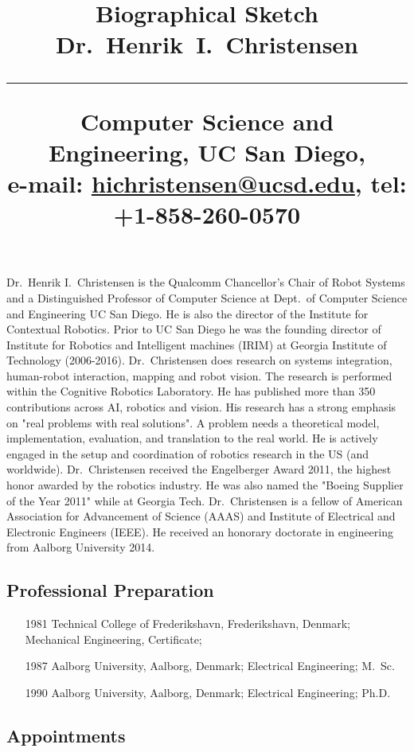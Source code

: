 \documentclass[svgnames,11pt]{article}
\title{%
        \vspace{-2\baselineskip}
            \normalsize
            Biographical Sketch\\
            {\large\textbf{Dr.~Henrik~I.~Christensen}}\\
            \vspace{0.5\baselineskip}
            \hrule
            \vspace{0.5\baselineskip}
            Computer Science and Engineering, UC San Diego,\\
            e-mail: \href{mailto:hichristensen@ucsd.edu}{hichristensen@ucsd.edu},
            tel: +1-858-260-0570
        \vspace{-1.5ex}
        }
\date{}
\author{}
\begin{document}
\maketitle
\vspace{-2\baselineskip}

Dr.~Henrik I.~Christensen is the Qualcomm
Chancellor's Chair of Robot Systems and a Distinguished Professor of
Computer Science at Dept.~of Computer Science and Engineering UC San
Diego. He is also the director of the Institute for Contextual
Robotics. Prior to UC San Diego he was the founding director of
Institute for Robotics and Intelligent machines (IRIM) at Georgia
Institute of Technology (2006-2016). Dr.~Christensen does research on
systems integration, human-robot interaction, mapping and robot
vision. The research is performed within the Cognitive Robotics
Laboratory. He has published more than 350 contributions across AI,
robotics and vision. His research has a strong emphasis on "real
problems with real solutions". A problem needs a theoretical model,
implementation, evaluation, and translation to the real world. He is
actively engaged in the setup and coordination of robotics research in
the US (and worldwide). Dr.~Christensen received the Engelberger Award
2011, the highest honor awarded by the robotics industry. He was also
named the "Boeing Supplier of the Year 2011" while at Georgia Tech.
Dr.~Christensen is a fellow of American Association for Advancement of
Science (AAAS) and Institute of Electrical and Electronic Engineers
(IEEE). He received an honorary doctorate in engineering from Aalborg
University 2014.

\subsection{Professional Preparation}
 \begin{itemize}[label={--9999:},leftmargin=*,itemsep=0pt]
    \item[1981]Technical College of Frederikshavn, Frederikshavn, Denmark;
    Mechanical Engineering, Certificate;

    \item[1987] Aalborg University, Aalborg, Denmark;
    Electrical Engineering; M.~Sc.

    \item[1990] Aalborg University, Aalborg, Denmark;
    Electrical Engineering; Ph.D.
  \end{itemize}
  
\subsection{Appointments}
\end{document}
